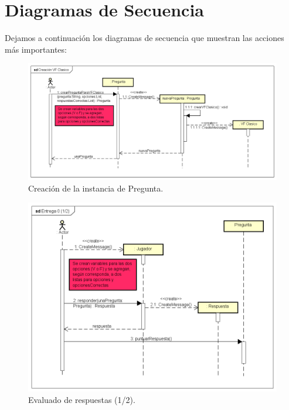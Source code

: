 \documentclass[titlepage,a4paper]{article}
\begin{document}
\newpage
\section{Diagramas de Secuencia}

Dejamos a continuación los diagramas de secuencia que muestran las acciones más importantes:

\begin{figure}[H]
\centering
\includegraphics[width=1\textwidth]{img/UMLSeq2.png}
\caption{\label{fig:class01}Creación de la instancia de Pregunta.}
\end{figure}

\begin{figure}[H]
\centering
\includegraphics[width=1\textwidth]{img/UMLSeq3.png}
\caption{\label{fig:class01}Evaluado de respuestas (1/2).}
\end{figure}
\end{document}
